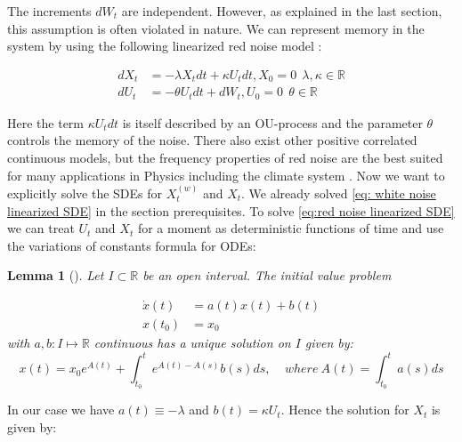 \documentclass[%
thesis=student,%
coverpage=false,%
titlepage=false,%
headmarks=true, %
english,%
font=libertine, %
math=newpxtx, %
BCOR=5mm,%
coverBCOR=11mm%
]{tumbook}
\newtheorem{lemma}{Lemma}
\begin{document}
The increments $dW_{t}$ are independent. However, as explained in the last section, this assumption is often violated in nature. We can represent memory in the system by using the following linearized red noise model \cite{Hanggi:1994,Morr:2022}:

\begin{subequations}
    \begin{align}
        dX_{t} &= -\lambda X_{t}dt + \kappa U_{t}dt, X_{0} = 0 \label{eq: 3.2a} \ \ \lambda,\kappa \in \mathbb{R}  \\ 
        dU_{t} &= -\theta U_{t}dt + dW_{t}, U_{0} = 0 \label{eq: 3.2b} \ \ \theta \in \mathbb{R}
    \end{align}
    \label{eq:red noise linearized SDE}
\end{subequations}

Here the term $\kappa U_{t}dt$ is itself described by an OU-process and the parameter $\theta$ controls the memory of the noise. There also exist other positive correlated continuous models, but the frequency properties of red noise are the best suited for many applications in Physics including the climate system \cite{Hasselmann:1976, Hanggi:1993, Liao:2022}. 
Now we want to explicitly solve the SDEs for $X_{t}^{(w)}$ and $X_{t}$. We already solved \eqref{eq: white noise linearized SDE} in the section prerequisites. To solve \eqref{eq:red noise linearized SDE} we can treat $U_{t}$ and $X_{t}$ for a moment as deterministic functions of time and use the variations of constants formula for ODEs: \\

\begin{lemma}[\cite{Kuttler:2023}]
    Let $I \subset \mathbb{R}$ be an open interval. The initial value problem
        
    \begin{subequations}
        \begin{align}
            \dot{x}(t) &= a(t)x(t) + b(t)  \\
            x(t_{0}) &= x_{0}
        \end{align}
    \end{subequations}
    with $a,b : I \mapsto \mathbb{R}$ continuous has a unique solution on $I$ given by:
    \[
    x(t) = x_{0}e^{A(t)} + \int_{t_{0}}^{t}e^{A(t)-A(s)}b(s)ds, \ \ \ \ \ where \ A(t) = \int_{t_{0}}^{t}a(s)ds
    \]
\end{lemma}
In our case we have $a(t) \equiv -\lambda$ and $b(t) = \kappa U_{t}$. Hence the solution for $X_{t}$ is given by:
\end{document}
